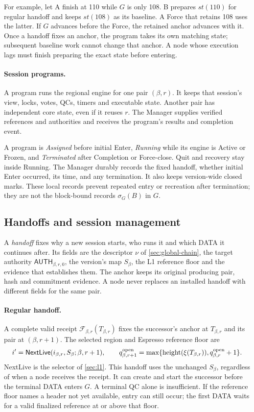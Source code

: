 \documentclass[11pt,a4paper]{article}
\newcommand{\FC}{\mathcal F}
\newcommand{\tagg}[1]{\ensuremath{\mathsf{#1}}}
\newcommand{\defterm}[1]{\textcolor{rrBlue}{\textit{#1}}}
\begin{document}
For example, let A finish at 110 while $G$ is only 108. B prepares
$\mathit{st}(110)$ for regular handoff and keeps $\mathit{st}(108)$ as
its baseline. A Force that retains 108 uses the latter. If $G$ advances
before the Force, the retained anchor advances with it. Once a handoff
fixes an anchor, the program takes its own matching state; subsequent
baseline work cannot change that anchor. A node whose execution lags
must finish preparing the exact state before entering.

\paragraph{Session programs.}
\label{sec:session-lifecycle}
A program runs the regional engine for one pair $(\beta,r)$. It keeps
that session's view, locks, votes, QCs, timers and executable state.
Another pair has independent core state, even if it reuses $r$.
The Manager supplies verified references and authorities and receives
the program's results and completion event.

A program is \defterm{Assigned} before initial Enter,
\defterm{Running} while its engine is Active or Frozen, and
\defterm{Terminated} after Completion or Force-close. Quit and recovery
stay inside Running. The Manager durably records the fixed handoff,
whether initial Enter occurred, its time, and any termination. It also
keeps version-wide closed marks. These local records prevent repeated
entry or recreation after termination; they are not the block-bound
records $\sigma_G(B)$ in $G$.

\subsection{Handoffs and session management}
\label{sec:witness}
A \defterm{handoff} fixes why a new session starts, who runs it and
which DATA it continues after. Its fields are the descriptor $\nu$ of
\cref{sec:global-chain}, the target authority $\tagg{AUTH}_{\beta,r,0}$,
the version's map $S_\beta$, the L1 reference floor and the evidence
that establishes them. The anchor keeps its original producing pair,
hash and commitment evidence. A node never replaces an installed
handoff with different fields for the same pair.

\paragraph{Regular handoff.}
A complete valid receipt $\FC_{\beta,r}(T_{\beta,r})$ fixes the
successor's anchor at $T_{\beta,r}$ and its pair at $(\beta,r+1)$.
The selected region and Espresso reference floor are
\[
 i'=\tagg{NextLive}(i_{\beta,r},S_\beta;\beta,r+1),\qquad
 q^{\rm open}_{\beta,r+1}
 =\max\{\operatorname{height}(\xi(T_{\beta,r})),
         q^{\rm open}_{\beta,r}+1\}.
\]
NextLive is the selector of \cref{sec:l1}. This handoff uses the
unchanged $S_\beta$, regardless of when a node receives the receipt.
It can create and start the successor before the terminal DATA enters
$G$. A terminal QC alone is insufficient. If the reference floor names
a header not yet available, entry can still occur; the first DATA waits
for a valid finalized reference at or above that floor.
\end{document}
